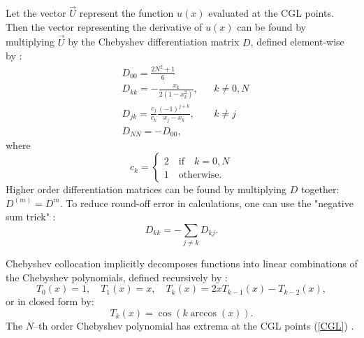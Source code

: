 \documentclass{article}
\begin{document}
Let the vector $\vec{U}$ represent the function $u(x)$ evaluated at the CGL points.
Then the vector representing the derivative of $u(x)$ can be found by multiplying $\vec{U}$ by the Chebyshev differentiation matrix $D$, defined element-wise by \cite{mason2002chebyshev}:
\begin{equation} \label{diff matrix}
\begin{aligned}
& D_{00} = \frac{2N^2 + 1}{6} \\
& D_{kk} = - \frac{x_k}{2 ( 1-x^2_k )}, && k \neq 0,N \\
& D_{jk} = \frac{c_j}{c_k} \frac{ (-1)^{j+k}}{x_j - x_k}, && k \neq j \\
& D_{NN} = - D_{00}, \end{aligned}
\end{equation}
where
\begin{equation} \label{weights}
c_k = \begin{cases} 2 \quad \text{if} \quad k=0,N \\ 1 \quad \text{otherwise} . \end{cases}
\end{equation}
Higher order differentiation matrices can be found by multiplying $D$ together: $D^{(m)} = D^m$.
To reduce round-off error in calculations, one can use the "negative sum trick" \cite{BaT2003}:
\begin{equation}
D_{kk} = - \sum_{j \neq k} D_{kj} .
\end{equation}

Chebyshev collocation implicitly decomposes functions into linear combinations of the Chebyshev polynomials, defined recursively by \cite{mason2002chebyshev}:
\begin{equation} \label{Cheb poly}
T_0(x) = 1, \quad T_1(x) = x, \quad T_k(x) = 2xT_{k-1}(x) - T_{k-2}(x) ,
\end{equation}
or in closed form by:
\begin{equation} \label{closed form}
T_k(x) = \cos ( k \arccos (x) ) .
\end{equation}
The $N$--th order Chebyshev polynomial has extrema at the CGL points (\ref{CGL}) \cite{mason2002chebyshev}.
\end{document}
